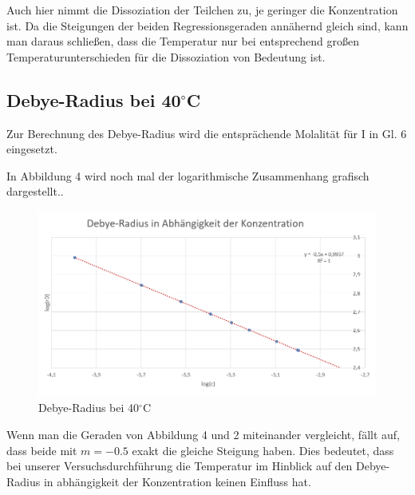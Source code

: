 Auch hier nimmt die Dissoziation der Teilchen zu, je geringer die Konzentration ist. Da die Steigungen der beiden Regressionsgeraden annähernd gleich sind,
kann man daraus schließen, dass die Temperatur nur bei entsprechend großen Temperaturunterschieden für die Dissoziation von Bedeutung ist. 



\subsection{Debye-Radius bei 40$^\circ$C}

Zur Berechnung des Debye-Radius wird die entsprächende Molalität für I in Gl. 6 eingesetzt.   

 

In Abbildung 4 wird noch mal der logarithmische Zusammenhang grafisch dargestellt..

\begin{figure}[H]
    \centering
    \includegraphics[scale=.7]{../src/img/graph2_40C.png}
    \caption{Debye-Radius bei 40$^\circ$C}
\end{figure}

Wenn man die Geraden von Abbildung 4 und 2 miteinander vergleicht, fällt auf, dass beide mit $m = - 0.5$ exakt die gleiche Steigung haben.
Dies bedeutet, dass bei unserer Versuchsdurchführung die Temperatur im Hinblick auf den Debye-Radius in abhängigkeit der Konzentration
keinen Einfluss hat.
